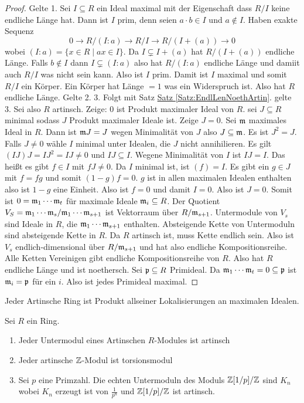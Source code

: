 \begin{proof}
    Gelte 1. Sei $I\subseteq R$ ein Ideal maximal mit der Eigenschaft dass $R/I$ keine endliche Länge hat. Dann ist $I$ prim, denn seien $a\cdot b\in I$ und $a\not\in I$. Haben exakte Sequenz
    $$0\to R/(I:a)\to R/I\to R/(I+(a))\to 0$$ wobei $(I:a)=\{x\in R\mid ax\in I\}$. Da $I\subsetneq I+(a)$ hat $R/(I+(a))$ endliche Länge. Falls $b\not\in I$ dann $I\subsetneq (I:a)$ also hat $R/(I:a)$ endliche Länge und damiit auch $R/I$ was nicht sein kann. Also ist $I$ prim. Damit ist $I$ maximal und somit $R/I$ ein Körper. Ein Körper hat Länge $=1$ was ein Widerspruch ist.
    Also hat $R$ endliche Länge.
    Gelte 2. 3. Folgt mit Satz \hyperref[Satz:EndlLenNoethArtin]{Satz \ref{Satz:EndlLenNoethArtin}}. gelte 3. Sei also $R$ artinsch. Zeige: $0$ ist Produkt maximaler Ideal von $R$.
    sei $J\subseteq R$ minimal sodass $J$ Produkt maximaler Ideale ist. Zeige $J=0$.
    Sei $\mathfrak{m} $ maximales Ideal in $R$. Dann ist $\mathfrak{m} J=J$ wegen Minimalität von $J$ also $J\subseteq \mathfrak{m}$. Es ist $J^2=J$.
    Falls $J\neq 0$ wähle $I$ minimal unter Idealen, die $J$ nicht annihilieren.
    Es gilt $(IJ)J=IJ^2=IJ\neq 0$ und $IJ\subseteq I$. Wegene Minimalität von $I$ ist $IJ=I$. Das heißt es gibt $f\in I$ mit $fJ\neq 0$. Da $I$ minimal ist, ist $(f)=I$. Es gibt ein $g\in J$ mit $f=fg$ und somit $(1-g)f=0$.
    $g$ ist in allen maximalen Idealen enthalten also ist $1-g$ eine Einheit. Also ist $f=0$ und damit $I=0$. Also ist $J=0$.
    Somit ist $0=\mathfrak{m}_1\cdots \mathfrak{m}_t$ für maximale Ideale $\mathfrak{m}_i\subseteq R$.
    Der Quotient $V_S=\mathfrak{m}_1\cdots \mathfrak{m}_s/\mathfrak{m}_1\cdots \mathfrak{m}_{s+1}$ ist Vektorraum über $R/\mathfrak{m}_{s+1}$. Untermodule von $V_s$ sind Ideale in $R$, die $\mathfrak{m}_1\cdots \mathfrak{m}_{s+1}$ enthalten.
    Absteigende Kette von Untermoduln sind absteigende Kette in $R$. Da $R$ artinsch ist, muss Kette endlich sein.
    Also ist $V_s$ endlich-dimensional über $R/\mathfrak{m}_{s+1}$ und hat also endliche Kompositionsreihe. Alle Ketten Vereinigen gibt endliche Kompositionsreihe von $R$. Also hat $R$ endliche Länge und ist noethersch. Sei $\mathfrak{p}\subseteq R$ Primideal. Da $\mathfrak{m}_1\cdots \mathfrak{m}_t=0\subseteq \mathfrak{p}$ ist $\mathfrak{m}_i=\mathfrak{p}$ für ein $i$. Also ist jedes Primideal maximal.
\end{proof}
\begin{Kor}\label{Kor:StruktArtinring}
    Jeder Artinsche Ring ist Produkt allseiner Lokalisierungen an maximalen Idealen.
\end{Kor}
\begin{Lemma}
    Sei $R$ ein Ring.
    \begin{enumerate}
        \item Jeder Untermodul eines Artinschen $R$-Modules ist artinsch
        \item Jeder artinsche $\mathbb{Z}$-Modul ist torsionsmodul
        \item Sei $p$ eine Primzahl. Die echten Untermoduln des Moduls $\mathbb{Z}[1/p]/\mathbb{Z}$ sind $K_n$ wobei $K_n$ erzeugt ist von $\frac{1}{p^n}$ und $\mathbb{Z}[1/p]/\mathbb{Z}$ ist artinsch.
    \end{enumerate}
\end{Lemma}
